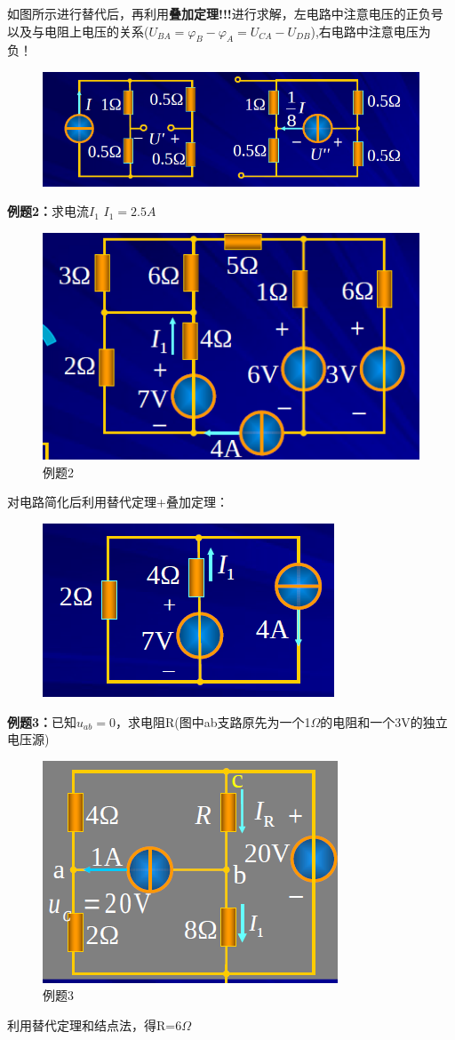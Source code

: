 \documentclass[11pt,a4paper,oneside]{book}
\begin{document}
如图所示进行替代后，再利用\textbf{叠加定理!!!}进行求解，左电路中注意电压的正负号以及与电阻上电压的关系($U_{BA}=\varphi_B-\varphi_A=U_{CA}-U_{DB}$),右电路中注意电压为负！
\begin{figure}[H]
	\centering
	\includegraphics[width=0.5\linewidth]{screenshot058}
	\caption{}
	\label{fig:screenshot058}
\end{figure}

\noindent\textbf{例题2：}求电流$I_1$ \quad $I_1=2.5A$
\begin{figure}[H]
	\centering
	\includegraphics[width=0.5\linewidth]{screenshot059}
	\caption{例题2}
	\label{fig:screenshot059}
\end{figure}
对电路简化后利用替代定理+叠加定理：
\begin{figure}[H]
	\centering
	\includegraphics[width=0.5\linewidth]{screenshot060}
	\caption{}
	\label{fig:screenshot060}
\end{figure}

\noindent\textbf{例题3：}已知$u_{ab}=0$，求电阻R(图中ab支路原先为一个1$\Omega$的电阻和一个3V的独立电压源)
\begin{figure}[H]
	\centering
	\includegraphics[width=0.3\linewidth]{screenshot061}
	\caption{例题3}
	\label{fig:screenshot061}
\end{figure}
利用替代定理和结点法，得R=6$\Omega$
\end{document}
